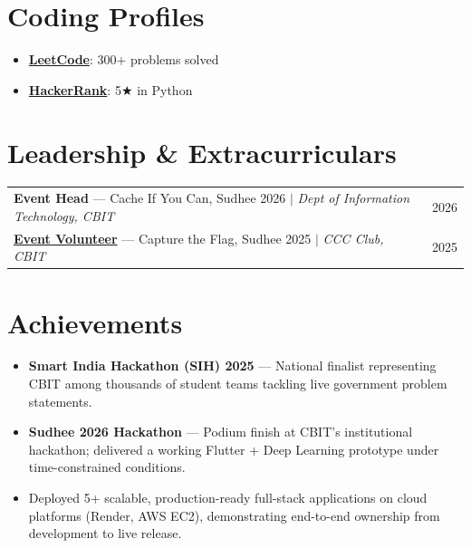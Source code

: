 \documentclass[a4paper,11pt]{article}
\begin{document}
\section{Coding Profiles}
\vspace{2pt}
\begin{itemize}[nosep, leftmargin=1.5em, itemsep=2pt]
  \item[--] \href{https://leetcode.com/u/SESH_MANUVARTHI/}{\textbf{LeetCode}}: 300+ problems solved
  \item[--] \href{https://www.hackerrank.com/profile/seshmanuvarthi27}{\textbf{HackerRank}}: 5$\bigstar$ in Python
\end{itemize}

\section{Leadership \& Extracurriculars}
\vspace{2pt}
\begin{tabularx}{\linewidth}{@{}l r@{}}
\textbf{Event Head} --- Cache If You Can, Sudhee 2026 $|$ \textit{Dept of Information Technology, CBIT} & \hfill 2026 \\[3pt]
\href{https://drive.google.com/file/d/1yupQx853bTCgPQpJUgdcno5PdC6kmpVC/view?usp=share_link}{\textbf{Event Volunteer}} --- Capture the Flag, Sudhee 2025 $|$ \textit{CCC Club, CBIT} & \hfill 2025 \\
\end{tabularx}

\section{Achievements}
\vspace{2pt}
\begin{itemize}[nosep, leftmargin=1.5em, itemsep=3pt]
  \item[--] \textbf{Smart India Hackathon (SIH) 2025} --- National finalist representing CBIT among thousands of student teams tackling live government problem statements.
  \item[--] \textbf{Sudhee 2026 Hackathon} --- Podium finish at CBIT's institutional hackathon; delivered a working Flutter + Deep Learning prototype under time-constrained conditions.
  \item[--] Deployed 5+ scalable, production-ready full-stack applications on cloud platforms (Render, AWS EC2), demonstrating end-to-end ownership from development to live release.
\end{itemize}
\end{document}
